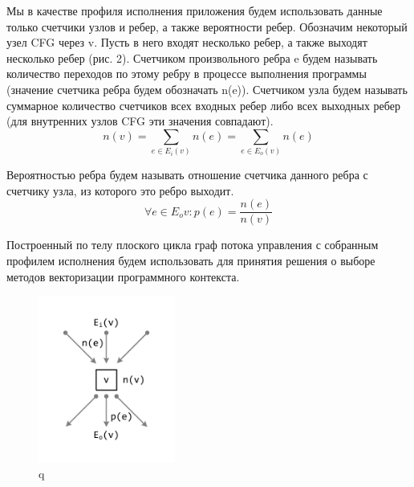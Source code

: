 Мы в качестве профиля исполнения приложения будем использовать данные только счетчики узлов и ребер, а также вероятности ребер. Обозначим некоторый узел CFG через v. Пусть в него входят несколько ребер, а также выходят несколько ребер (рис. 2).
Счетчиком произвольного ребра e будем называть количество переходов по этому ребру в процессе выполнения программы (значение счетчика ребра будем обозначать n(e)).
Счетчиком узла будем называть суммарное количество счетчиков всех входных ребер либо всех выходных ребер (для внутренних узлов CFG эти значения совпадают).
\begin{equation}
	n(v) = \sum_{e \in E_i(v)}{n(e)} = \sum_{e \in E_o(v)}{n(e)}
\end{equation}

Вероятностью ребра будем называть отношение счетчика данного ребра с счетчику узла, из которого это ребро выходит.
\begin{equation}
	\forall e \in E_o{v}: p(e) = \frac{n(e)}{n(v)}
\end{equation}

Построенный по телу плоского цикла граф потока управления с собранным профилем исполнения будем использовать для принятия решения о выборе методов векторизации программного контекста.

\begin{figure}[ht]
\centering
\includegraphics[width=0.4\textwidth]{./pics/text_4_flat/cfg.pdf}
\caption{q}
\label{lab}
\end{figure}
